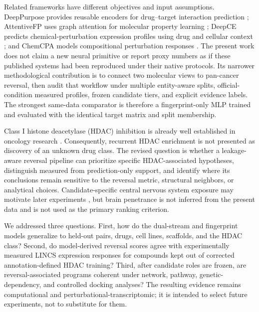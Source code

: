 Related frameworks have different objectives and input assumptions. DeepPurpose provides reusable encoders for drug--target interaction prediction \cite{huang2021deeppurpose}; AttentiveFP uses graph attention for molecular property learning \cite{xiong2019attentivefp}; DeepCE predicts chemical-perturbation expression profiles using drug and cellular context \cite{nguyen2021deepce}; and ChemCPA models compositional perturbation responses \cite{hetzel2022chemcpa}. The present work does not claim a new neural primitive or report proxy numbers as if these published systems had been reproduced under their native protocols. Its narrower methodological contribution is to connect two molecular views to pan-cancer reversal, then audit that workflow under multiple entity-aware splits, official-condition measured profiles, frozen candidate tiers, and explicit evidence labels. The strongest same-data comparator is therefore a fingerprint-only MLP trained and evaluated with the identical target matrix and split membership.

\begin{minorrevision}
Class I histone deacetylase (HDAC) inhibition is already well established in oncology research \cite{johnstone2002,bolden2006,bradner2010}. Consequently, recurrent HDAC enrichment is not presented as discovery of an unknown drug class. The revised question is whether a leakage-aware reversal pipeline can prioritize specific HDAC-associated hypotheses, distinguish measured from prediction-only support, and identify where its conclusions remain sensitive to the reversal metric, structural neighbors, or analytical choices. Candidate-specific central nervous system exposure may motivate later experiments \cite{wagner2010,mcclure2018}, but brain penetrance is not inferred from the present data and is not used as the primary ranking criterion.\par
\end{minorrevision}

We addressed three questions. First, how do the dual-stream and fingerprint models generalize to held-out pairs, drugs, cell lines, scaffolds, and the HDAC class? Second, do model-derived reversal scores agree with experimentally measured LINCS expression responses for compounds kept out of corrected annotation-defined HDAC training? Third, after candidate roles are frozen, are reversal-associated programs coherent under network, pathway, genetic-dependency, and controlled docking analyses? The resulting evidence remains computational and perturbational-transcriptomic; it is intended to select future experiments, not to substitute for them.

